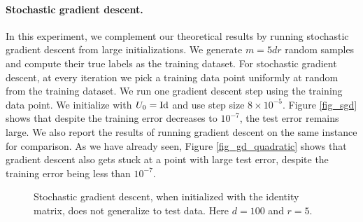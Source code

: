 \paragraph{Stochastic gradient descent.}
In this experiment, we complement our theoretical results by running stochastic gradient descent from large initializations.
We generate $m = 5dr$ random samples and compute their true labels as the training dataset.
For stochastic gradient descent, at every iteration we pick a training data point uniformly at random from the training dataset.
We run one gradient descent step using the training data point.
We initialize with $U_0 = \operatorname{Id}$ and use step size $8 \times 10^{-5}$.
Figure \ref{fig_sgd} shows that despite the training error decreases to $10^{-7}$, the test error remains large.
We also report the results of running gradient descent on the same instance for comparison.
As we have already seen, Figure \ref{fig_gd_quadratic} shows that gradient descent also gets stuck at a point with large test error, despite the training error being less than $10^{-7}$.


\begin{figure}[!ht]
	\centering
	\caption{Stochastic gradient descent, when initialized with the identity matrix, does not generalize to test data. Here $d = 100$ and $r = 5$.}
\end{figure}

